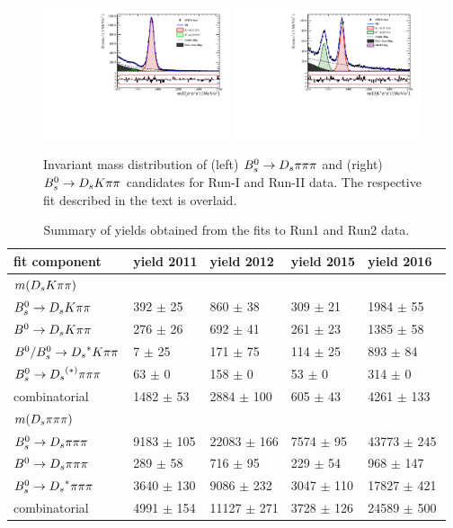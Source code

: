 \begin{figure}[h]
\centering
\includegraphics[height=!,width=0.49\textwidth]{figs/MassFit/norm_pull.pdf}
\includegraphics[height=!,width=0.49\textwidth]{figs/MassFit/signal_pull.pdf}
\caption{Invariant mass distribution of (left) ${{B}^0_{s}}\rightarrow{\ensuremath{{D}_{s}}}{\ensuremath{\pi}}{\ensuremath{\pi}}{\ensuremath{\pi}}$ and (right) ${{B}^0_{s}}\rightarrow{\ensuremath{{D}_{s}}}{\ensuremath{K}}{\ensuremath{\pi}}{\ensuremath{\pi}}$ candidates for Run-I and Run-II data.
The respective fit described in the text is overlaid.}
\label{fig: BsDsKpipiFit}
\end{figure}


\begin{table}[h]
\centering
 \begin{tabular}{l || l l l l}
fit component & yield 2011 & yield 2012 & yield 2015 & yield 2016\ \\
\hline\hline
$m({{D}_{s}}{K}{\pi}{\pi})$ &  &  &  &  \\
\hline
${{B}^0_{s}}\rightarrow{\ensuremath{{D}_{s}}}{\ensuremath{K}}{\ensuremath{\pi}}{\ensuremath{\pi}}$ & 392 $\pm$ 25 & 860 $\pm$ 38 & 309 $\pm$ 21 & 1984 $\pm$ 55 \\
${{B}^0}\rightarrow{\ensuremath{{D}_{s}}}{\ensuremath{K}}{\ensuremath{\pi}}{\ensuremath{\pi}}$ & 276 $\pm$ 26 & 692 $\pm$ 41 & 261 $\pm$ 23 & 1385 $\pm$ 58 \\
${{B}^0}/{{B}^0_{s}}\rightarrow{\ensuremath{{D}_{s}}}^{*}{K}{\pi}{\pi}$ & 7 $\pm$ 25 & 171 $\pm$ 75 & 114 $\pm$ 25 & 893 $\pm$ 84 \\
${{B}^0_{s}}\rightarrow{\ensuremath{{D}_{s}}}^{(*)}{\pi}{\pi}{\pi}$ & 63 $\pm$ 0 & 158 $\pm$ 0 & 53 $\pm$ 0 & 314 $\pm$ 0 \\
combinatorial & 1482 $\pm$ 53 & 2884 $\pm$ 100 & 605 $\pm$ 43 & 4261 $\pm$ 133 \\
\hline\hline
$m({{D}_{s}}{\pi}{\pi}{\pi})$ &  &  &  &  \\
\hline
${{B}^0_{s}}\rightarrow{\ensuremath{{D}_{s}}}{\ensuremath{\pi}}{\ensuremath{\pi}}{\ensuremath{\pi}}$ & 9183 $\pm$ 105 & 22083 $\pm$ 166 & 7574 $\pm$ 95 & 43773 $\pm$ 245 \\
${{B}^0}\rightarrow{\ensuremath{{D}_{s}}}{\ensuremath{\pi}}{\ensuremath{\pi}}{\ensuremath{\pi}}$ & 289 $\pm$ 58 & 716 $\pm$ 95 & 229 $\pm$ 54 & 968 $\pm$ 147 \\
${{B}^0_{s}}\rightarrow{\ensuremath{{D}_{s}}}^{*}{\pi}{\pi}{\pi}$ & 3640 $\pm$ 130 & 9086 $\pm$ 232 & 3047 $\pm$ 110 & 17827 $\pm$ 421 \\
combinatorial & 4991 $\pm$ 154 & 11127 $\pm$ 271 & 3728 $\pm$ 126 & 24589 $\pm$ 500 \\
\hline
\end{tabular}
\caption{Summary of yields obtained from the fits to Run1 and Run2 data.}
\label{table:YieldsFromMassfit}
\end{table}


